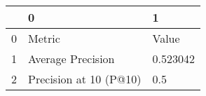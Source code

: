 \begin{tabular}{lll}
\toprule
{} &                       0 &         1 \\
\midrule
0 &                  Metric &     Value \\
1 &       Average Precision &  0.523042 \\
2 &  Precision at 10 (P@10) &       0.5 \\
\bottomrule
\end{tabular}
